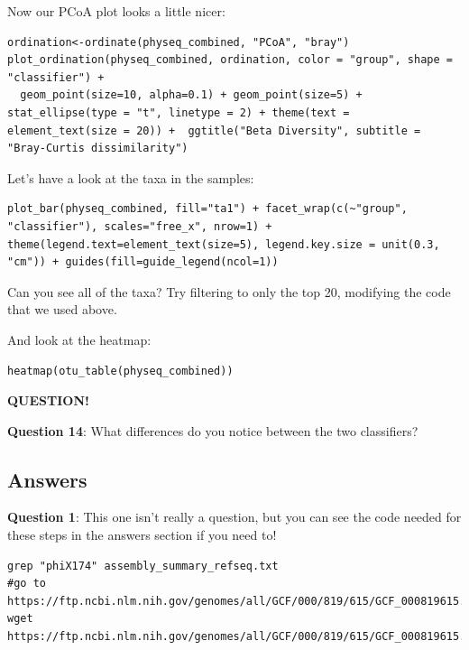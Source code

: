 \documentclass[
]{book}
\newenvironment{bluebox}{
  \definecolor{shadecolor}{RGB}{172, 210, 237}
  \color{white}
  \begin{shaded}}
 {\end{shaded}}
\begin{document}
Now our PCoA plot looks a little nicer:

\begin{verbatim}
ordination<-ordinate(physeq_combined, "PCoA", "bray")
plot_ordination(physeq_combined, ordination, color = "group", shape = "classifier") +
  geom_point(size=10, alpha=0.1) + geom_point(size=5) + stat_ellipse(type = "t", linetype = 2) + theme(text = element_text(size = 20)) +  ggtitle("Beta Diversity", subtitle = "Bray-Curtis dissimilarity")
\end{verbatim}

Let's have a look at the taxa in the samples:

\begin{verbatim}
plot_bar(physeq_combined, fill="ta1") + facet_wrap(c(~"group", "classifier"), scales="free_x", nrow=1) + theme(legend.text=element_text(size=5), legend.key.size = unit(0.3, "cm")) + guides(fill=guide_legend(ncol=1))
\end{verbatim}

Can you see all of the taxa? Try filtering to only the top 20, modifying the code that we used above.

And look at the heatmap:

\begin{verbatim}
heatmap(otu_table(physeq_combined))
\end{verbatim}

\begin{bluebox}

\begin{center}
\textbf{QUESTION!}

\end{center}

\textbf{Question 14}: What differences do you notice between the two classifiers?

\end{bluebox}

\subsection{Answers}\label{answers}

\textbf{Question 1}: This one isn't really a question, but you can see the code needed for these steps in the answers section if you need to!

\begin{verbatim}
grep "phiX174" assembly_summary_refseq.txt 
#go to https://ftp.ncbi.nlm.nih.gov/genomes/all/GCF/000/819/615/GCF_000819615.1_ViralProj14015/
wget https://ftp.ncbi.nlm.nih.gov/genomes/all/GCF/000/819/615/GCF_000819615.1_ViralProj14015/GCF_000819615.1_ViralProj14015_genomic.fna.gz
\end{verbatim}
\end{document}
